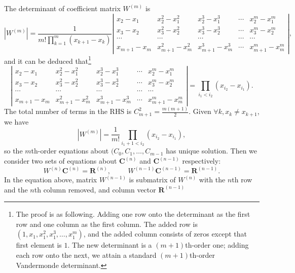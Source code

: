\documentclass[]{article}
\def\abs#1{\left|#1\right|}
\begin{document}
The determinant of coefficient matrix $W^{(m)}$ is
\begin{equation*}
\abs{W^{(m)}}=\frac{1}{\displaystyle m!\prod_{k=1}^m(x_{k+1}-x_k)}\abs{
\begin{array}{ccccc}
x_2-x_1 & x_2^2-x_1^2 & x_2^3-x_1^3 & \cdots & x_2^m-x_1^m \\[3mm]
x_3-x_2 & x_3^2-x_2^2 & x_3^3-x_2^3 & \cdots & x_3^m-x_2^m \\
\cdots &\cdots &\cdots &\cdots &\cdots \\
x_{m+1}-x_m & x_{m+1}^2-x_m^2 & x_{m+1}^3-x_m^3 & \cdots & x_{m+1}^m-x_m^m
\end{array}
},
\end{equation*}
and it can be deduced that\footnote{The proof is as following. Adding one row
onto the determinant as the first row and one column as the first column. The
added row is $(1, x_1, x_1^2, x_1^3, \ldots, x_1^m)$, and the added column
consists of zeros except that first element is $1$. The new determinant is a
$(m+1)$th-order one; adding each row onto the next, we attain a standard
$(m+1)$th-order Vandermonde determinant.}
\begin{equation}
\abs{\begin{array}{ccccc}
x_2-x_1 & x_2^2-x_1^2 & x_2^3-x_1^3 & \cdots & x_2^m-x_1^m \\[3mm]
x_3-x_2 & x_3^2-x_2^2 & x_3^3-x_2^3 & \cdots & x_3^m-x_2^m \\
\cdots &\cdots &\cdots &\cdots &\cdots \\
x_{m+1}-x_m & x_{m+1}^2-x_m^2 & x_{m+1}^3-x_m^3 & \cdots & x_{m+1}^m-x_m^m 
\end{array} }=\prod_{i_1<i_2}(x_{i_2}-x_{i_1}).
\label{eq:Vande2}
\end{equation}
The total number of terms in the RHS is $C_{m+1}^2 = \frac{m(m+1)}{2}$. Given
$\forall k, x_k \neq x_{k+1}$, we have
\begin{equation*}
\abs{W^{(m)}} = \frac{1}{m!}\prod_{i_1+1<i_2}(x_{i_2}-x_{i_1}),
\end{equation*}
so the $m$th-order equations about $(C_0, C_1, \ldots, C_{m-1}$ has unique
solution. Then we consider two sets of equations about $\bm C^{(n)}$ and
$\bm C^{(n-1)}$ respectively:
\begin{equation}
W^{(n)}\bm C^{(n)}=\bm R^{(n)},\hspace{1cm}W^{(n-1)}\bm C^{(n-1)}=\bm R^{(n-1)}.
\label{eq:C-n-C-n1}
\end{equation}
In the equation above, matrix $W^{(n-1)}$ is submatrix of $W^{(n)}$ with the
$n$th row and the $n$th column removed, and column vector $\bm R^{(n-1)}$
\end{document}
